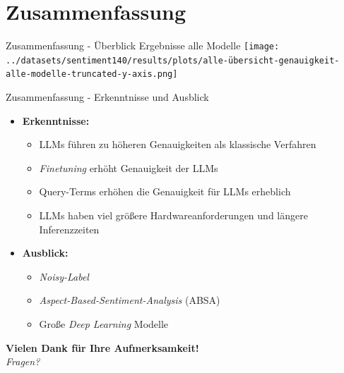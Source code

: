 \documentclass[aspectratio=169]{beamer}
\begin{document}
\section{Zusammenfassung}

\begin{frame}{Zusammenfassung - Überblick Ergebnisse alle Modelle}
	\centering
	\texttt{[image: ../datasets/sentiment140/results/plots/alle-übersicht-genauigkeit-alle-modelle-truncated-y-axis.png]}
\end{frame}

\begin{frame}{Zusammenfassung - Erkenntnisse und Ausblick}
	\normalsize
	\begin{itemize}
		\item \textbf{Erkenntnisse:}
		      \begin{itemize}
			      \item LLMs führen zu höheren Genauigkeiten als klassische Verfahren
			      \item \textit{Finetuning} erhöht Genauigkeit der LLMs
			      \item Query-Terms erhöhen die Genauigkeit für LLMs erheblich
			      \item LLMs haben viel größere Hardwareanforderungen und längere Inferenzzeiten
		      \end{itemize}
		      \vspace{0.4cm}
		\item \textbf{Ausblick:}
		      \begin{itemize}
			      \item \textit{Noisy-Label}
			      \item \textit{Aspect-Based-Sentiment-Analysis} (ABSA)
			      \item Große \textit{Deep Learning} Modelle
		      \end{itemize}
	\end{itemize}

	\vspace{0.5cm}
	\centering
	\pause
	{\large \textbf{Vielen Dank für Ihre Aufmerksamkeit!}} \\[0.1cm]
	\textit{Fragen?}
\end{frame}
\end{document}
